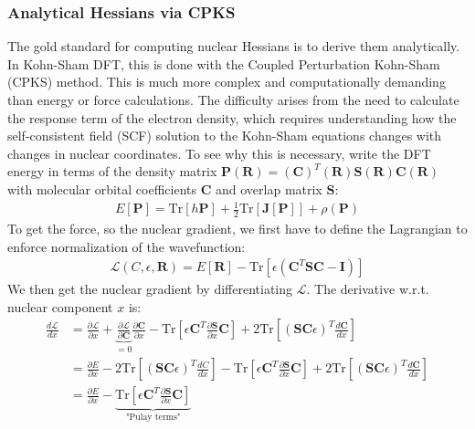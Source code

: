 \documentclass[pdflatex,sn-mathphys-num]{sn-jnl}%
\theoremstyle{thmstyleone}%
\theoremstyle{thmstyletwo}%
\theoremstyle{thmstylethree}%
\begin{document}
\begin{appendices}
\subsubsection{Analytical Hessians via CPKS}
\label{sec:cpks}
The gold standard for computing nuclear Hessians is to derive them analytically. In Kohn-Sham DFT, this is done with the Coupled Perturbation Kohn-Sham (CPKS) method. This is much more complex and computationally demanding than energy or force calculations. The difficulty arises from the need to calculate the response term of the electron density, which requires understanding how the self-consistent field (SCF) solution to the Kohn-Sham equations changes with changes in nuclear coordinates. To see why this is necessary, write the DFT energy in terms of the density matrix $\mathbf{P}(\mathbf{R}) = (\mathbf{C})^T(\mathbf{R}) \mathbf{S}(\mathbf{R}) \mathbf{C}(\mathbf{R})$ with molecular orbital coefficients $\mathbf{C}$ and overlap matrix $\mathbf{S}$: 
\begin{align}
    E[\mathbf{P}] = \text{Tr}[h\mathbf{P}] + \frac{1}{2} \text{Tr}[\mathbf{J}[\mathbf{P}]] + \rho(\mathbf{P})
\end{align}
To get the force, so the nuclear gradient, we first have to define the Lagrangian to enforce normalization of the wavefunction:
\begin{align}
\mathcal{L}(C, \epsilon, \mathbf{R}) = E[\mathbf{R}] - \text{Tr}[\epsilon (\mathbf{C}^T\mathbf{S}\mathbf{C} - \mathbf{I})] \label{eq:lagrangian}
\end{align}
We then get the nuclear gradient by differentiating $\mathcal{L}$. The derivative w.r.t. nuclear component $x$ is:
\begin{align}
    \frac{d\mathcal{L}}{dx} &= \frac{\partial\mathcal{L}}{\partial x} + \underbrace{\frac{\partial \mathcal{L}}{\partial \mathbf{C}}}_{=0} \frac{\partial \mathbf{C}}{\partial x} - \text{Tr}\left[\epsilon \mathbf{C}^T \frac{\partial \mathbf{S}}{\partial x} \mathbf{C}\right] + 2 \text{Tr}\left[(\mathbf{S}\mathbf{C}\epsilon)^T\frac{d\mathbf{C}}{dx}\right] \\
    &= \frac{\partial E}{\partial x} - 2 \text{Tr}\left[(\mathbf{S}\mathbf{C}\epsilon)^T\frac{dC}{dx}\right]  -\text{Tr}\left[\epsilon \mathbf{C}^T \frac{\partial \mathbf{S}}{\partial x} \mathbf{C}\right] + 2 \text{Tr}\left[(\mathbf{S}\mathbf{C}\epsilon)^T\frac{d\mathbf{C}}{dx}\right] \\
    &= \frac{\partial E}{\partial x}  -\underbrace{\text{Tr}\left[\epsilon \mathbf{C}^T \frac{\partial \mathbf{S}}{\partial x} \mathbf{C}\right]}_\text{"Pulay terms"} \label{eq:analytic_grad}

\end{align}
\end{appendices}
\end{document}
